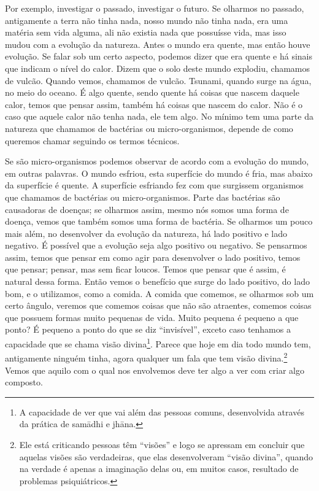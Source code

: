 Por exemplo, investigar o passado, investigar o futuro. Se olharmos
no passado, antigamente a terra não tinha nada, nosso mundo não tinha
nada, era uma matéria sem vida alguma, ali não existia nada que
possuísse vida, mas isso mudou com a evolução da natureza. Antes o
mundo era quente, mas então houve evolução. Se falar sob um certo
aspecto, podemos dizer que era quente e há sinais que indicam o nível
do calor. Dizem que o solo deste mundo explodiu, chamamos de vulcão.
Quando vemos, chamamos de vulcão. Tsunami, quando surge na água, no
meio do oceano. É algo quente, sendo quente há coisas que nascem
daquele calor, temos que pensar assim, também há coisas que nascem do
calor. Não é o caso que aquele calor não tenha nada, ele tem algo. No
mínimo tem uma parte da natureza que chamamos de bactérias ou
micro-organismos, depende de como queremos chamar
seguindo os termos técnicos. 

Se são micro-organismos podemos observar de acordo com a evolução do
mundo, em outras palavras. O mundo esfriou, esta superfície do mundo é
fria, mas abaixo da superfície é quente. A superfície esfriando fez com
que surgissem organismos que chamamos de bactérias ou micro-organismos.
Parte das bactérias são causadoras de doenças; se olharmos assim, mesmo
nós somos uma forma de doença, vemos que também somos uma forma de
bactéria. Se olharmos um pouco mais além, no desenvolver da evolução da
natureza, há lado positivo e lado negativo. É possível que a evolução
seja algo positivo ou negativo. Se pensarmos
assim, temos que pensar em como agir para desenvolver o lado positivo,
temos que pensar; pensar, mas sem ficar loucos. Temos que pensar que é
assim, é natural dessa forma. Então vemos o benefício que surge do lado
positivo, do lado bom, e o utilizamos, como a comida. A comida que
comemos, se olharmos sob um certo ângulo, veremos que comemos coisas
que não são atraentes, comemos coisas que possuem formas muito pequenas
de vida. Muito pequena é pequeno a que ponto? É pequeno a ponto do que
se diz “invisível”, exceto caso tenhamos a capacidade que se chama
visão divina\footnote{A capacidade de ver que vai além das pessoas
comuns, desenvolvida através da prática de samādhi e jhāna.}.
Parece que hoje em dia todo mundo tem, antigamente ninguém tinha, agora
qualquer um fala que tem visão divina.\footnote{Ele está criticando
pessoas têm “visões” e logo se apressam em concluir que aquelas visões
são verdadeiras, que elas desenvolveram “visão divina”, quando na
verdade é apenas a imaginação delas ou, em muitos casos, resultado de
problemas psiquiátricos.} Vemos que aquilo com o qual nos envolvemos
deve ter algo a ver com criar algo composto.


